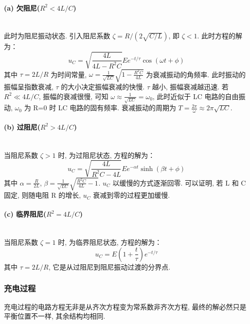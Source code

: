 \documentclass[zihao=5, UTF8]{article}
\theoremstyle{MyLineTheoremStyle} %
\theoremstyle{MyBlockTheoremStyle} %
\theoremstyle{MySubsubsectionStyle} %
\begin{document}
\paragraph{(a) 欠阻尼($R^2 < 4L/C$)}
~\\
此时为阻尼振动状态. 引入阻尼系数 $\zeta = R / (2 \sqrt{C/L})$, 即 $\zeta < 1$. 此时方程的解为：
\begin{equation}
u_C = \sqrt{\frac{4L}{4L - R^2 C}} E e^{-t/\tau} \cos(\omega t + \phi)
\end{equation}
其中 $\tau = 2L/R$ 为时间常量, $\omega = \frac{1}{\sqrt{LC}} \sqrt{1 - \frac{R^2 C}{4L}}$ 为衰减振动的角频率. 此时振动的振幅呈指数衰减, $\tau$ 的大小决定振幅衰减的快慢. $\tau$ 越小, 振幅衰减越迅速. 若 $R^2 \ll 4L/C$, 振幅的衰减很慢, 可知 $\omega \approx \frac{1}{\sqrt{LC}} = \omega_0$, 此时近似于 LC 电路的自由振动, $\omega_0$ 为 R=0 时 LC 电路的固有频率. 衰减振动的周期为 $T = \frac{2\pi}{\omega} \approx 2\pi \sqrt{LC}$. 

\paragraph{(b) 过阻尼($R^2 > 4L/C$)}
~\\
当阻尼系数 $\zeta > 1$ 时, 为过阻尼状态, 方程的解为：
\begin{equation}
u_C = \sqrt{\frac{4L}{R^2 C - 4L}} E e^{-\alpha t} \sinh(\beta t + \phi)
\end{equation}
其中 $\alpha = \frac{R}{2L}$, $\beta = \frac{1}{\sqrt{LC}} \sqrt{\frac{R^2 C}{4L} - 1}$. $u_C$ 以缓慢的方式逐渐回零. 可以证明, 若 L 和 C 固定, 则随电阻 R 的增长, $u_C$ 衰减到零的过程更加缓慢. 

\paragraph{(c) 临界阻尼($R^2 = 4L/C$)}
~\\
当阻尼系数 $\zeta = 1$ 时, 为临界阻尼状态, 方程的解为：
\begin{equation}
u_C = E \left(1 + \frac{t}{\tau}\right) e^{-t/\tau}
\end{equation}
其中 $\tau = 2L/R$, 它是从过阻尼到阻尼振动过渡的分界点. 

\subsubsection{充电过程}

充电过程的电路方程无非是从齐次方程变为常系数非齐次方程, 最终的解必然只是平衡位置不一样, 其余结构均相同. 
\end{document}
